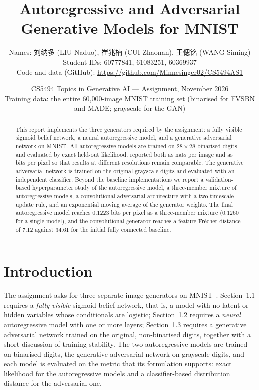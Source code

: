 \documentclass[11pt,a4paper]{article}
\title{\bfseries Autoregressive and Adversarial Generative Models for MNIST}
\author{Names: {\zhfont 刘纳多} (LIU Naduo), {\zhfont 崔兆楠} (CUI Zhaonan),
{\zhfont 王偲铭} (WANG Siming)\\
\small Student IDs: 60777841, 61083251, 60369937\\
\small Code and data (GitHub): \url{https://github.com/Minnesinger02/CS5494AS1}}
\date{CS5494 Topics in Generative AI --- Assignment, November 2026\\[2pt]
\small Training data: the entire 60{,}000-image MNIST training set
(binarised for FVSBN and MADE; grayscale for the GAN)}
\begin{document}
\maketitle

\begin{abstract}
\noindent
This report implements the three generators required by the assignment: a fully visible
sigmoid belief network, a neural autoregressive model, and a generative adversarial network
on MNIST. All autoregressive models are trained on $28\times28$ binarised digits and evaluated
by exact held-out likelihood, reported both as nats per image and as bits per pixel so that
results at different resolutions remain comparable. The generative adversarial network is
trained on the original grayscale digits and evaluated with an independent classifier.
Beyond the baseline implementations we report a validation-based hyperparameter study of the
autoregressive model, a three-member mixture of autoregressive models, a convolutional
adversarial architecture with a two-timescale update rule, and an exponential moving average
of the generator weights. The final autoregressive model reaches $0.1223$ bits per pixel as a
three-member mixture ($0.1260$ for a single model), and the convolutional generator reaches a
feature-Fr\'echet distance of 7.12 against 34.61 for the initial fully connected baseline.
\end{abstract}

\newpage
\tableofcontents
\newpage
\section{Introduction}

The assignment asks for three separate image generators on MNIST~\parencite{mnist1998}.
Section~1.1 requires a \emph{fully visible} sigmoid belief network, that is, a model with no
latent or hidden variables whose conditionals are logistic; Section~1.2 requires a
\emph{neural} autoregressive model with one or more layers; Section~1.3 requires a generative
adversarial network trained on the original, non-binarised digits, together with a short
discussion of training stability.
The two autoregressive models are trained on binarised digits, the generative adversarial
network on grayscale digits, and each model is evaluated on the metric that its formulation
supports: exact likelihood for the autoregressive models and a classifier-based distribution
distance for the adversarial one.
\end{document}
